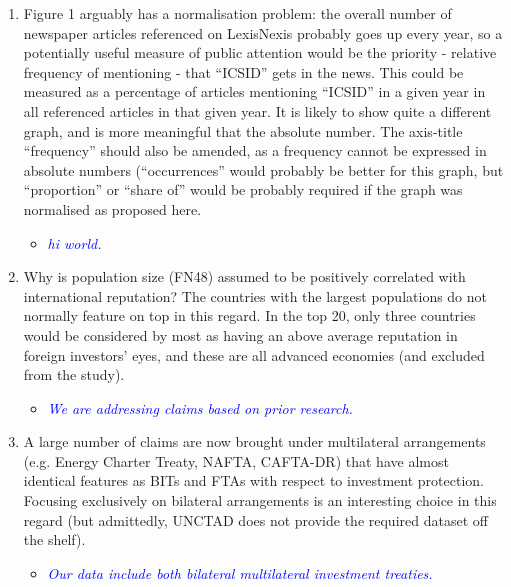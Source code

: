 \begin{enumerate}
\begin{itemize}
	\end{itemize}
	\item Figure 1 arguably has a normalisation problem: the overall number of newspaper articles referenced on LexisNexis probably goes up every year, so a potentially useful measure of public attention would be the priority - relative frequency of mentioning - that ``ICSID'' gets in the news. This could be measured as a percentage of articles mentioning ``ICSID'' in a given year in all referenced articles in that given year. It is likely to show quite a different graph, and is more meaningful that the absolute number. The axis-title ``frequency'' should also be amended, as a frequency cannot be expressed in absolute numbers (``occurrences'' would probably be better for this graph, but ``proportion'' or ``share of'' would be probably required if the graph was normalised as proposed here. 	
	\begin{itemize}
		\item \textcolor{blue}{ \emph{ 
		hi world.
		}}
	\end{itemize}
	\item Why is population size (FN48) assumed to be positively correlated with international reputation? The countries with the largest populations do not normally feature on top in this regard. In the top 20, only three countries would be considered by most as having an above average reputation in foreign investors' eyes, and these are all advanced economies (and excluded from the study). 
	\begin{itemize}
		\item \textcolor{blue}{ \emph{
		We are addressing claims based on prior research.
		}}
	\end{itemize}
	\item A large number of claims are now brought under multilateral arrangements (e.g. Energy Charter Treaty, NAFTA, CAFTA-DR) that have almost identical features as BITs and FTAs with respect to investment protection. Focusing exclusively on bilateral arrangements is an interesting choice in this regard (but admittedly, UNCTAD does not provide the required dataset off the shelf). 		
	\begin{itemize}
		\item \textcolor{blue}{
		\emph{ 
		Our data include both bilateral multilateral investment treaties.
		}}
	\end{itemize}	
\end{enumerate}
